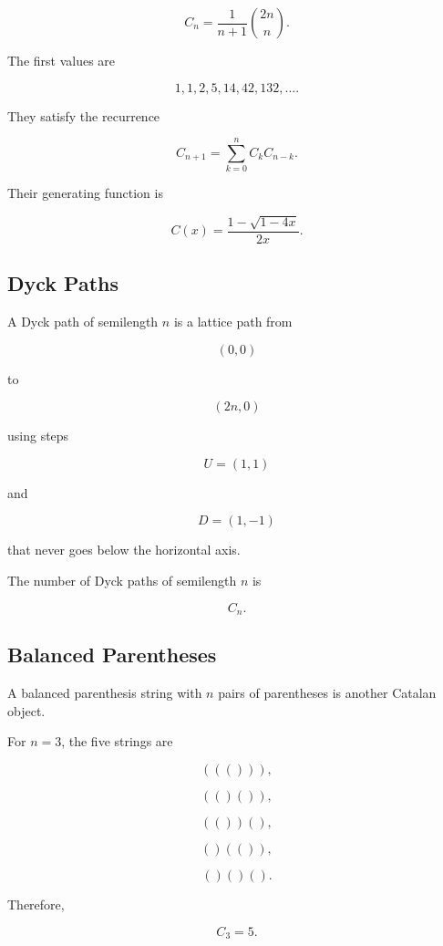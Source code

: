 \[
\boxed{
C_n
=
\frac{1}{n+1}
\binom{2n}{n}.
}
\]

The first values are

\[
1,1,2,5,14,42,132,\ldots.
\]

They satisfy the recurrence

\[
\boxed{
C_{n+1}
=
\sum_{k=0}^{n}C_kC_{n-k}.
}
\]

Their generating function is

\[
\boxed{
C(x)
=
\frac{1-\sqrt{1-4x}}{2x}.
}
\]

\subsection{Dyck Paths}
\label{subsec:dyck-paths}

A Dyck path of semilength \(n\) is a lattice path from

\[
(0,0)
\]

to

\[
(2n,0)
\]

using steps

\[
U=(1,1)
\]

and

\[
D=(1,-1)
\]

that never goes below the horizontal axis.

The number of Dyck paths of semilength \(n\) is

\[
\boxed{
C_n.
}
\]

\subsection{Balanced Parentheses}
\label{subsec:balanced-parentheses}

A balanced parenthesis string with \(n\) pairs of parentheses is another
Catalan object.

For \(n=3\), the five strings are

\[
((())),
\]

\[
(()()),
\]

\[
(())(),
\]

\[
()(()),
\]

\[
()()().
\]

Therefore,

\[
\boxed{
C_3=5.
}
\]

